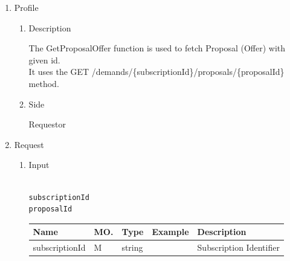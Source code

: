 \newpage


\begin{enumerate}

\item Profile

\begin{enumerate}

\item Description

The GetProposalOffer function is used to fetch Proposal (Offer) with given id. \\
It uses the GET /demands/\{subscriptionId\}/proposals/\{proposalId\} method.

\item Side

Requestor

\end{enumerate}

\item Request

\begin{enumerate}

\item Input

\begin{tcolorbox}[boxrule=0pt, frame empty]
\begin{verbatim}

subscriptionId
proposalId

\end{verbatim}
\end{tcolorbox}


\begin{table}[H]
\footnotesize

\begin{center}
\begin{tabular}{|p{3cm}|l|p{3cm}|p{3cm}|p{4cm}|} 
\hline
\rowcolor{lightgray}	Name	& MO.	& Type	& Example & 	Description \\
\hline

subscriptionId	& M	& 	string			&		&	Subscription Identifier \\ 
\hline


\end{tabular}
\end{center}
\end{table}
\end{enumerate}
\end{enumerate}
